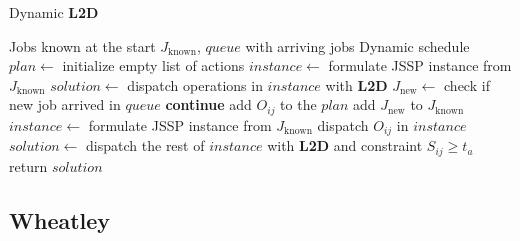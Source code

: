 \begin{algorithm}
	\caption{Dynamic \textbf{L2D}} \label{algorithm:l2d}
	\begin{algorithmic}[1]
    \renewcommand{\algorithmicrequire}{\hspace*{\algorithmicindent}  \textbf{Input:}}
    \renewcommand{\algorithmicensure}{\hspace*{\algorithmicindent}  \textbf{Output:}}
    \Require Jobs known at the start $J_\text{known}$, $queue$ with arriving jobs
    \Ensure Dynamic schedule
    \State $plan \gets$ initialize empty list of actions 
    \State $instance \gets$ formulate JSSP instance from $J_\text{known}$
    \State $solution \gets$ dispatch operations in $instance$ with \textbf{L2D} 
        \State $J_\text{new} \gets$ check if new job arrived in $queue$
            \State \textbf{continue}
        \EndIf
                \State add $O_{ij}$ to the $plan$
            \EndIf
		\EndFor
        \State add $J_\text{new}$ to $J_\text{known}$
        \State $instance \gets$ formulate JSSP instance from $J_\text{known}$
            \State dispatch $O_{ij}$ in $instance$
        \EndFor
        \State $solution \gets$ dispatch the rest of $instance$ with \textbf{L2D} and constraint $S_{ij} \geq t_a$ 
	\EndWhile
    \State return $solution$
\end{algorithmic}
\end{algorithm}

\subsection{Wheatley}


